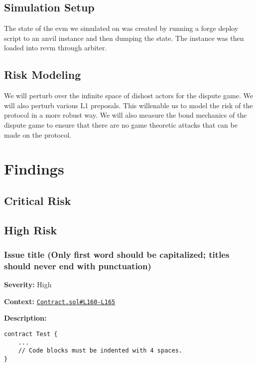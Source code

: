 
\subsection{Simulation Setup}\label{simulation-setup}
The state of the evm we simulated on was created by running a forge deploy script to an anvil instance and then dumping the state. The instance was then loaded into revm through arbiter.

\subsection{Risk Modeling}\label{risk-modeling}

We will perturb over the infinite space of dishost actors for the
dispute game. We will also perturb various L1 preposals. This willenable us to model the risk of the protocol in a more robust way. We will also measure the bond mechanics of the dispute game to ensure that there are no game theoretic attacks that can be made on the protocol.

\section{Findings}\label{findings}

\subsection{Critical Risk}\label{critical-risk}

\subsection{High Risk}\label{high-risk}

\subsubsection{Issue title (Only first word should be capitalized;
titles should never end with
punctuation)}\label{issue-title-only-first-word-should-be-capitalized-titles-should-never-end-with-punctuation}

\textbf{Severity:} High

\textbf{Context:}
\href{https://github.com/actuallink}{\texttt{Contract.sol\#L160-L165}}

\textbf{Description:}

\begin{verbatim}
contract Test {
    ...
    // Code blocks must be indented with 4 spaces.
}
\end{verbatim}

